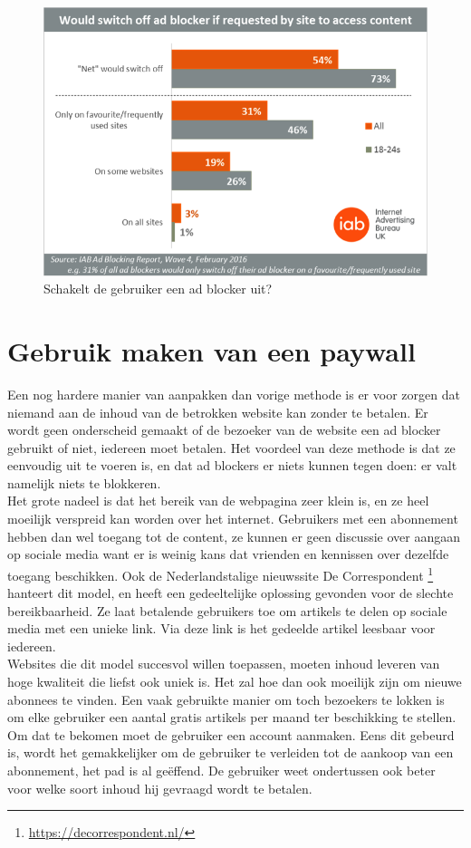 \documentclass[pdftex,a4paper,12pt,twoside]{report}
\begin{document}
\begin{figure}[h!]
\centering
\includegraphics[width=12cm]{img/Adblockblock}
\caption{Schakelt de gebruiker een ad blocker uit?}
\label{fig: Adblockblock}
\end{figure}

\section{Gebruik maken van een paywall}
\label{sec Gebruik maken van een paywall}
Een nog hardere manier van aanpakken dan vorige methode is er voor zorgen dat niemand aan de inhoud van de betrokken website kan zonder te betalen. Er wordt geen onderscheid gemaakt of de bezoeker van de website een ad blocker gebruikt of niet, iedereen moet betalen. Het voordeel van deze methode is dat ze eenvoudig uit te voeren is, en dat ad blockers er niets kunnen tegen doen: er valt namelijk niets te blokkeren.
\\
Het grote nadeel is dat het bereik van de webpagina zeer klein is, en ze heel moeilijk verspreid kan worden over het internet. Gebruikers met een abonnement hebben dan wel toegang tot de content, ze kunnen er geen discussie over aangaan op sociale media want er is weinig kans dat vrienden en kennissen over dezelfde toegang beschikken. Ook de Nederlandstalige nieuwssite De Correspondent \footnote{\url{https://decorrespondent.nl/}} hanteert dit model, en heeft een gedeeltelijke oplossing gevonden voor de slechte bereikbaarheid. Ze laat betalende gebruikers toe om artikels te delen op sociale media met een unieke link. Via deze link is het gedeelde artikel leesbaar voor iedereen.
\\ 
Websites die dit model succesvol willen toepassen, moeten inhoud leveren van hoge kwaliteit die liefst ook uniek is. Het zal hoe dan ook moeilijk zijn om nieuwe abonnees te vinden. Een vaak gebruikte manier om toch bezoekers te lokken is om elke gebruiker een aantal gratis artikels per maand ter beschikking te stellen. Om dat te bekomen moet de gebruiker een account aanmaken. Eens dit gebeurd is, wordt het gemakkelijker om de gebruiker te verleiden tot de aankoop van een abonnement, het pad is al geëffend. De gebruiker weet ondertussen ook beter voor welke soort inhoud hij gevraagd wordt te betalen.
\end{document}
